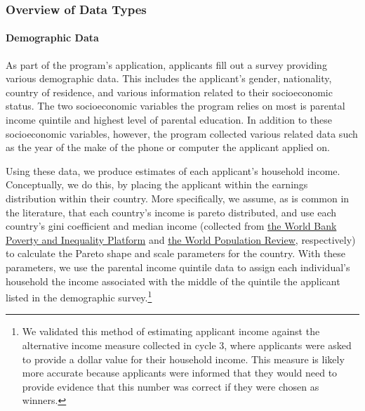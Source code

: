 \subsubsection{Overview of Data Types}

\paragraph{Demographic Data} As part of the program's application, applicants fill out a survey providing various demographic data. This includes the applicant's gender, nationality, country of residence, and various information related to their socioeconomic status. The two socioeconomic variables the program relies on most is parental income quintile and highest level of parental education. In addition to these socioeconomic variables, however, the program collected various related data such as the year of the make of the phone or computer the applicant applied on.

Using these data, we produce estimates of each applicant's household income. Conceptually, we do this, by placing the applicant within the earnings distribution within their country. More specifically, we assume, as is common in the literature, that each country's income is pareto distributed, and use each country's gini coefficient and median income (collected from \hyperlink{https://data.worldbank.org/indicator/SI.POV.GINI}{the World Bank Poverty and Inequality Platform} and \hyperlink{https://worldpopulationreview.com/country-rankings/median-income-by-country}{the World Population Review}, respectively) to calculate the Pareto shape and scale parameters for the country. With these parameters, we use the parental income quintile data to assign each individual's household the income associated with the middle of the quintile the applicant listed in the demographic survey.\footnote{We validated this method of estimating applicant income against the alternative income measure collected in cycle 3, where applicants were asked to provide a dollar value for their household income. This measure is likely more accurate because applicants were informed that they would need to provide evidence that this number was correct if they were chosen as winners.}

